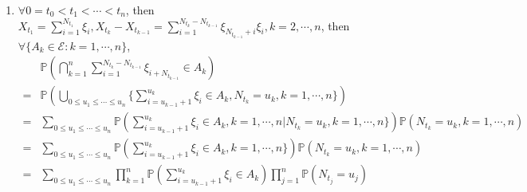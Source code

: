 \documentclass{ctexart}
\begin{document}
\begin{solution}
\begin{enumerate}
      Last, we will prove that \(\{\xi_{N_s + n}:n \in \mathbb{N}^+\}\) are independent with \((N_{t + s}-N_s:t \geq 0)\).
      \(\forall \{A_n \in \mathscr{E}:n \in \mathbb{N}^+\}, k \in \mathbb{N}\), then
      \(\mathbb{P}(\bigcap_{n \in \mathbb{N}^+}\{\xi_{N_s + n} \in A_n\}\cap\{N_{t + s}-N_{s}=k\})=
      \mathbb{P}(\bigcup_{i \in \mathbb{N}}(\bigcap_{n \in \mathbb{N}^+}\{\xi_{i + n} \in A_n\}\cap\{N_{t + s}=k + i,N_s=k\}))=
      \sum_{i \in \mathbb{N}}\mathbb{P}(\bigcap_{n \in \mathbb{N}^+}\{\xi_{i + n} \in A_n\}\cap\{N_{t + s}=k + i, N_s =i\})=
      \sum_{i \in \mathbb{N}}\mathbb{P}(\bigcap_{n \in \mathbb{N}^+}\{\xi_{i + n} \in A_n\})\mathbb{P}(N_{t + s}=k + i, N_s =i)=
      \sum_{i \in \mathbb{N}}\prod_{n \in \mathbb{N}^+}\mathbb{P}(\xi_{1 + n} \in A_n)\mathbb{P}(N_{t + s}=k + i, N_s=i)=
      \prod_{n \in \mathbb{N}^+}\mathbb{P}(\xi_{1 + n} \in A_n)\mathbb{P}(N_{t + s}-N_s=k)=
      \prod_{n \in \mathbb{N}^+}\mathbb{P}(\xi_{N_s + n} \in A_n)\mathbb{P}(N_{t + s}-N_s=k)=
      \mathbb{P}(\bigcap_{n \in \mathbb{N}^+}\{\xi_{N_s + n} \in A_n\})\mathbb{P}(N_{t + s}-N_s=k)\).
    \item \(\forall 0 = t_0<t_1<\cdots<t_n\), then \(X_{t_1}=\sum_{i =1}^{N_{t_1}}\xi_i,X_{t_k}-X_{t_{k-1}}=\sum_{i=1}^{N_{t_k}-N_{t_{k-1}}}\xi_{N_{t_{k-1}} + i}\xi_i,k=2,\cdots,n\),
      then \(\forall\{A_k \in \mathscr{E}:k=1,\cdots,n\}\),
      \begin{equation}
        \begin{aligned}
            & \mathbb{P}(\bigcap_{k =1}^n \sum_{i=1}^{N_{t_k}-N_{t_{k-1}}}\xi_{i + N_{t_{k-1}}} \in A_k)                                                                                              \\
          = & \mathbb{P}(\bigcup_{0 \leq u_1\leq \cdots\leq u_n}\{\sum_{i=u_{k-1}+1}^{u_k}\xi_{i} \in A_k,N_{t_k}=u_k,k=1,\cdots,n\})                                                                 \\
          = & \sum_{0 \leq u_1\leq \cdots\leq u_n}\mathbb{P}(\sum_{i=u_{k-1} + 1}^{u_k}\xi_i  \in A_k, k=1,\cdots,n| N_{t_k}=u_k,k=1,\cdots,n\})\mathbb{P}(N_{t_{k}}=u_k,k=1,\cdots,n)                \\
          = & \sum_{0 \leq u_1\leq \cdots\leq u_n}\mathbb{P}(\sum_{i=u_{k-1} + 1}^{u_k}\xi_i  \in A_k, k=1,\cdots,n\})\mathbb{P}(N_{t_{k}}=u_k,k=1,\cdots,n)                                          \\
          = & \sum_{0 \leq u_1\leq \cdots\leq u_n}\prod_{k=1}^{n} \mathbb{P}(\sum_{i=u_{k-1} + 1}^{u_k}\xi_i  \in A_k)\prod_{j=1}^{n} \mathbb{P}(N_{t_{j}}=u_j)                                       \\

\end{aligned}
\end{equation}
\end{enumerate}
\end{solution}
\end{document}
